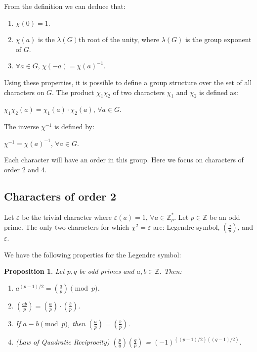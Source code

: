 \documentclass[11pt, a4paper, twoside, openright]{report}
\newtheorem{proposition}{Proposition}
\begin{document}
 	From the definition we can deduce that: 
 	
 	\begin{enumerate}
 		
 		\item $\chi(0)=1$.
 		\item $\chi(a)$ is the $\lambda(G)$th root of the unity, where $\lambda(G)$ is the group exponent of $G$.
 		\item $\forall a \in G$, $\chi(-a)= \chi(a)^{-1}$.  
 	\end{enumerate}
 	
 		Using these properties, it is possible to define a group structure over the set of all characters on $G$. The product 
 	 	$\chi_1 \chi_2$ of two characters $\chi_1$ and $\chi_2$ is defined as:
 	
 	\hspace{30mm}  $\chi_1 \chi_2(a) = \chi_1(a) \cdot \chi_2(a)$, $\forall a \in G$. 
 	
 	The inverse $\chi^{-1}$ is defined by:
 	
 	\hspace{30mm} $\chi^{-1}= \chi(a)^{-1}$, $\forall a \in G$.
 	
 	Each character will have an order in this group. Here we focus on characters of order 2 and 4. 
 	
 	\subsection{Characters of order 2}
 	
 		Let $\varepsilon$ be the trivial character where $\varepsilon(a)=1$, $\forall a \in \mathbb{Z}_p^*$.
 		Let $p \in \mathbb{Z}$ be an odd prime. The only two characters for which $\chi^2= \varepsilon$ are: Legendre symbol, $(\frac{a}{p})$,  and $\varepsilon$. 
 		
 		
 		We have the following properties for the Legendre symbol: 
 		
 		\begin{proposition}
 		Let $p,q$ be odd primes and $a,b \in \mathbb{Z}$. Then:
 		\begin{enumerate}
 			
 			\item $a^{(p-1)/2} = (\frac{a}{p}) \pmod{p}$.
 			\item $(\frac{ab}{p})= (\frac{a}{p}) \cdot (\frac{b}{p})$.
 			\item If $a \equiv b \pmod{p}$, then $(\frac{a}{p}) = (\frac{b}{p})$.
 			\item (Law of Quadratic Reciprocity) $(\frac{p}{q}) (\frac{q}{p})$ = $(-1)^{((p-1)/2)((q-1)/2)}$.
  
 		\end{enumerate}
 		\end{proposition}
 		
\end{document}
